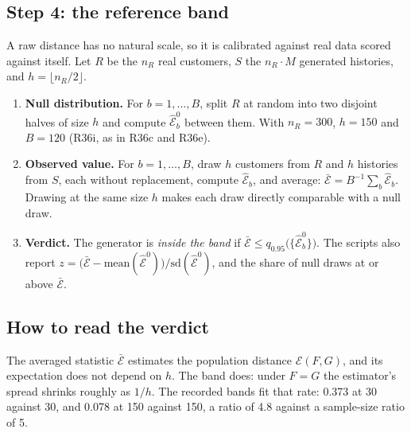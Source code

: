 \documentclass[11pt]{article}
\begin{document}
\subsection{Step 4: the reference band}

A raw distance has no natural scale, so it is calibrated against real data
scored against itself. Let $R$ be the $n_R$ real customers, $S$ the
$n_R \cdot M$ generated histories, and $h = \lfloor n_R/2 \rfloor$.

\begin{enumerate}
\item \textbf{Null distribution.} For $b = 1,\dots,B$, split $R$ at random into
  two disjoint halves of size $h$ and compute $\widehat{\mathcal{E}}_b^{0}$
  between them. With $n_R = 300$, $h = 150$ and $B = 120$ (R36i, as in R36c
  and R36e).
\item \textbf{Observed value.} For $b = 1,\dots,B$, draw $h$ customers from $R$
  and $h$ histories from $S$, each without replacement, compute
  $\widehat{\mathcal{E}}_b$, and average:
  $\bar{\mathcal{E}} = B^{-1}\sum_b \widehat{\mathcal{E}}_b$. Drawing at the
  same size $h$ makes each draw directly comparable with a null draw.
\item \textbf{Verdict.} The generator is \emph{inside the band} if
  $\bar{\mathcal{E}} \le q_{0.95}\big(\{\widehat{\mathcal{E}}_b^{0}\}\big)$.
  The scripts also report
  $z = \big(\bar{\mathcal{E}} - \text{mean}(\widehat{\mathcal{E}}^0)\big) /
  \text{sd}(\widehat{\mathcal{E}}^0)$, and the share of null draws at or above
  $\bar{\mathcal{E}}$.
\end{enumerate}

\subsection{How to read the verdict}

The averaged statistic $\bar{\mathcal{E}}$ estimates the population distance
$\mathcal{E}(F,G)$, and its expectation does not depend on $h$. The band does:
under $F=G$ the estimator's spread shrinks roughly as $1/h$. The recorded bands
fit that rate: 0.373 at 30 against 30, and 0.078 at 150 against 150, a ratio of
4.8 against a sample-size ratio of 5.
\end{document}

